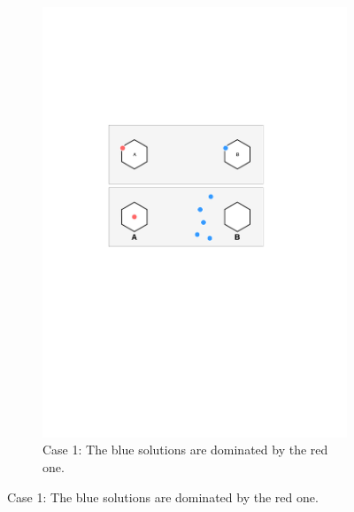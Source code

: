 \documentclass[conference]{IEEEtran}
\begin{document}
\begin{figure}[htbp]
	\centering
	\begin{subfigure}[b]{.3\textwidth}
		\includegraphics[width=\linewidth]{Section3/case1}
		\caption{Case 1: The blue solutions are dominated by the red one.}
	\end{subfigure}
	

\end{figure}
\end{document}
